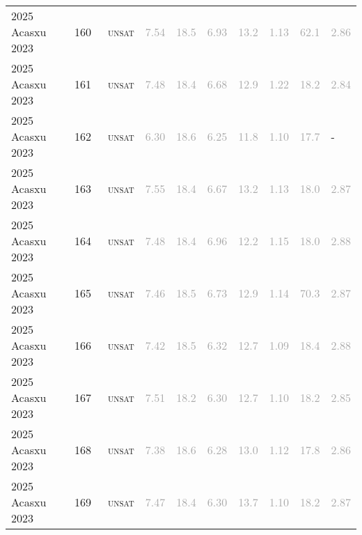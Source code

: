 \begin{center}
{\begin{longtable}{@{}llllllllll@{}}
2025 Acasxu 2023 & 160 & ~\textsc{unsat} & \textcolor{darkgray}{7.54} & \textcolor{darkgray}{18.5} & \textcolor{darkgray}{6.93} & \textcolor{darkgray}{13.2} & \textcolor{darkgray}{1.13} & \textcolor{darkgray}{62.1} & \textcolor{darkgray}{2.86} \\
2025 Acasxu 2023 & 161 & ~\textsc{unsat} & \textcolor{darkgray}{7.48} & \textcolor{darkgray}{18.4} & \textcolor{darkgray}{6.68} & \textcolor{darkgray}{12.9} & \textcolor{darkgray}{1.22} & \textcolor{darkgray}{18.2} & \textcolor{darkgray}{2.84} \\
2025 Acasxu 2023 & 162 & ~\textsc{unsat} & \textcolor{darkgray}{6.30} & \textcolor{darkgray}{18.6} & \textcolor{darkgray}{6.25} & \textcolor{darkgray}{11.8} & \textcolor{darkgray}{1.10} & \textcolor{darkgray}{17.7} & - \\
2025 Acasxu 2023 & 163 & ~\textsc{unsat} & \textcolor{darkgray}{7.55} & \textcolor{darkgray}{18.4} & \textcolor{darkgray}{6.67} & \textcolor{darkgray}{13.2} & \textcolor{darkgray}{1.13} & \textcolor{darkgray}{18.0} & \textcolor{darkgray}{2.87} \\
2025 Acasxu 2023 & 164 & ~\textsc{unsat} & \textcolor{darkgray}{7.48} & \textcolor{darkgray}{18.4} & \textcolor{darkgray}{6.96} & \textcolor{darkgray}{12.2} & \textcolor{darkgray}{1.15} & \textcolor{darkgray}{18.0} & \textcolor{darkgray}{2.88} \\
2025 Acasxu 2023 & 165 & ~\textsc{unsat} & \textcolor{darkgray}{7.46} & \textcolor{darkgray}{18.5} & \textcolor{darkgray}{6.73} & \textcolor{darkgray}{12.9} & \textcolor{darkgray}{1.14} & \textcolor{darkgray}{70.3} & \textcolor{darkgray}{2.87} \\
2025 Acasxu 2023 & 166 & ~\textsc{unsat} & \textcolor{darkgray}{7.42} & \textcolor{darkgray}{18.5} & \textcolor{darkgray}{6.32} & \textcolor{darkgray}{12.7} & \textcolor{darkgray}{1.09} & \textcolor{darkgray}{18.4} & \textcolor{darkgray}{2.88} \\
2025 Acasxu 2023 & 167 & ~\textsc{unsat} & \textcolor{darkgray}{7.51} & \textcolor{darkgray}{18.2} & \textcolor{darkgray}{6.30} & \textcolor{darkgray}{12.7} & \textcolor{darkgray}{1.10} & \textcolor{darkgray}{18.2} & \textcolor{darkgray}{2.85} \\
2025 Acasxu 2023 & 168 & ~\textsc{unsat} & \textcolor{darkgray}{7.38} & \textcolor{darkgray}{18.6} & \textcolor{darkgray}{6.28} & \textcolor{darkgray}{13.0} & \textcolor{darkgray}{1.12} & \textcolor{darkgray}{17.8} & \textcolor{darkgray}{2.86} \\
2025 Acasxu 2023 & 169 & ~\textsc{unsat} & \textcolor{darkgray}{7.47} & \textcolor{darkgray}{18.4} & \textcolor{darkgray}{6.30} & \textcolor{darkgray}{13.7} & \textcolor{darkgray}{1.10} & \textcolor{darkgray}{18.2} & \textcolor{darkgray}{2.87} \\

\end{longtable}}
\end{center}
